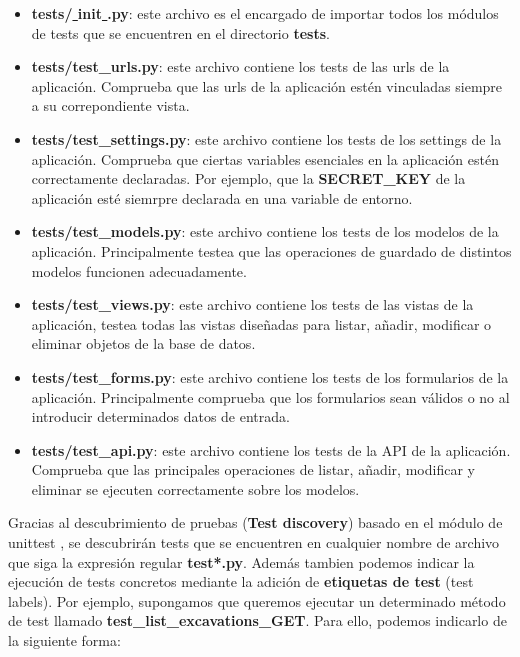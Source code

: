     \begin{itemize}
        \item \textbf{tests/\underline{  }init\underline{  }.py}: este archivo es el
        encargado de importar todos los módulos de tests que se encuentren en el
        directorio \textbf{tests}.
        \item \textbf{tests/test\_urls.py}: este archivo contiene los tests de las urls de la
        aplicación. Comprueba que las urls de la aplicación estén vinculadas siempre a su
        correpondiente vista.
        \item \textbf{tests/test\_settings.py}: este archivo contiene los tests de los settings
        de la aplicación. Comprueba que ciertas variables esenciales en la aplicación
        estén correctamente declaradas. Por ejemplo, que la \textbf{SECRET\_KEY} de la
        aplicación esté siemrpre declarada en una variable de entorno.
        \item \textbf{tests/test\_models.py}: este archivo contiene los tests de los modelos
        de la aplicación. Principalmente testea que las operaciones de guardado de distintos
        modelos funcionen adecuadamente.
        \item \textbf{tests/test\_views.py}: este archivo contiene los tests de las vistas
        de la aplicación, testea todas las vistas diseñadas para listar, añadir, modificar o
        eliminar objetos de la base de datos.
        \item \textbf{tests/test\_forms.py}: este archivo contiene los tests de los formularios
        de la aplicación. Principalmente comprueba que los formularios sean válidos o no
        al introducir determinados datos de entrada.
        \item \textbf{tests/test\_api.py}: este archivo contiene los tests de la API de la
        aplicación. Comprueba que las principales operaciones de listar, añadir, modificar y
        eliminar se ejecuten correctamente sobre los modelos.
    \end{itemize}

Gracias al descubrimiento de pruebas (\textbf{Test discovery}) basado en el módulo de
unittest \cite{test-discovery}, se descubrirán tests que se encuentren en cualquier nombre
de archivo que siga la expresión regular \textbf{test*.py}. Además tambien podemos indicar
la ejecución de tests concretos mediante la adición de \textbf{etiquetas de test} (test
labels). Por ejemplo, supongamos que queremos ejecutar un determinado método de test
llamado \textbf{test\_list\_excavations\_GET}. Para ello, podemos indicarlo de la siguiente
forma:

